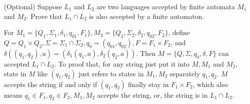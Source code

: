 \documentclass[10pt]{homework}
\begin{document}
\begin{solution}
\end{solution}

\begin{problem} (Optional) Suppose $L_{1}$ and $L_{2}$ are two languages accepted
  by finite automata $M_{1}$ and $M_{2}$.
  Prove that $L_{1} \cap L_{2}$ is also accepted by a finite automaton.
\end{problem}

\begin{solution}
    For $M_1=\{Q_1,\Sigma_1,\delta_1,q_{01},F_1\},M_2=\{Q_2,\Sigma_2,\delta_2,q_{02},F_2\}$, define $Q=Q_1\times Q_2,\Sigma=\Sigma_1\cap\Sigma_2,q_0=(q_{01},q_{02}),F=F_1\times F_2$, and $\delta((q_1,q_2),a)=(\delta_1(q_1,a),\delta_2(q_2,a))$. Then $M=\{Q,\Sigma,q_0,\delta,F\}$ can accepted $L_1\cap L_2$. To proof that, for any string just put it into $M,M_1$ and $M_2$, state in $M$ like $(q_1,q_2)$ just refers to states in $M_1,M_2$ separately $q_1,q_2$. $M$ accepts the string if and only if $(q_1,q_2)$ finally stay in $F_1\times F_2$, which also means $q_1\in F_1,q_2\in F_2,M_1,M_2$ accepts the string, or, the string is in $L_1\cap L_2$.
\end{solution}
\end{document}
